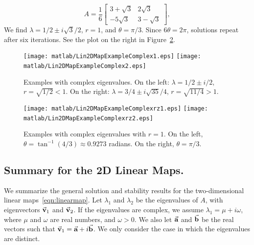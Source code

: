 \begin{xexample}
\begin{equation}
A = \frac{1}{6}\begin{bmatrix} 3+\sqrt{3} & 2\sqrt{3}\\ -5\sqrt{3} &  3-\sqrt{3}\end{bmatrix},
\end{equation}
We find $\lambda = 1/2 \pm i\sqrt{3}/2$, $r = 1$, and
$\theta=\pi/3$.
Since $6\theta = 2\pi$, solutions repeat after six iterations.
See the plot on the right in Figure~\ref{fig:Lin2DMapExampleComplexrz}.
\end{xexample}



\begin{figure}
\centerline{%
\texttt{[image: matlab/Lin2DMapExampleComplex1.eps]}
\texttt{[image: matlab/Lin2DMapExampleComplex2.eps]}
}
\caption{%
Examples with complex eigenvalues.
On the left:
$\lambda = 1/2 \pm i/2$, $r = \sqrt{1/2} < 1$.
On the right:
$\lambda = 3/4 \pm i\sqrt{35}/4$, $r = \sqrt{11/4} > 1$.
}
\label{fig:Lin2DMapExampleComplex1}
\end{figure}
%
\begin{figure}
\centerline{%
\texttt{[image: matlab/Lin2DMapExampleComplexrz1.eps]}
\texttt{[image: matlab/Lin2DMapExampleComplexrz2.eps]}
}
\caption{%
Examples with complex eigenvalues with $r=1$.
On the left,
$\theta = \tan^{-1}(4/3)\approx 0.9273$ radians.
On the right,
$\theta=\pi/3$.
}
\label{fig:Lin2DMapExampleComplexrz}
\end{figure}

\newpage

\subsection*{Summary for the 2D Linear Maps.}
We summarize the general solution and stability results
for the two-dimensional linear maps~\eqref{eqn:linearmap}.
Let $\lambda_1$ and $\lambda_2$ be the eigenvalues of
$A$, with eigenvectors $\vec{\textbf{v}}_1$ and $\vec{\textbf{v}}_2$.
If the eigenvalues are complex, we assume
$\lambda_1 = \mu+i\omega$, where $\mu$ and $\omega$
are real numbers, and $\omega > 0$.  We also let $\vec{\textbf{a}}$ and $\vec{\textbf{b}}$
be the real vectors such that $\vec{\textbf{v}}_1 = \vec{\textbf{a}}+i\vec{\textbf{b}}$.
We only consider the case in which the eigenvalues are distinct. 

